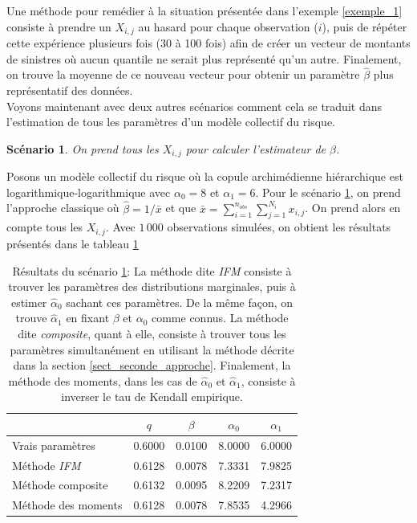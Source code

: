 \documentclass[11pt]{article}
\newtheorem{scenario}{Scénario}
\begin{document}
 		Une méthode pour remédier à la situation présentée dans l'exemple \ref{exemple_1} consiste à prendre un $X_{i,j}$ au hasard pour chaque observation ($i$), puis de répéter cette expérience plusieurs fois (30 à 100 fois) afin de créer un vecteur de montants de sinistres où aucun quantile ne serait plus représenté qu'un autre. Finalement, on trouve la moyenne de ce nouveau vecteur pour obtenir un paramètre $\hat{\beta}$ plus représentatif des données. \\
 		
 		Voyons maintenant avec deux autres scénarios comment cela se traduit dans l'estimation de tous les paramètres d'un modèle collectif du risque.
 		
 		\begin{scenario}\label{scenario_tous_les_Xij}
 			On prend tous les $X_{i,j}$ pour calculer l'estimateur de $\beta$.
 		\end{scenario}
 			Posons un modèle collectif du risque où la copule archimédienne hiérarchique est logarithmique-logarithmique avec $\alpha_0 = 8$ et $\alpha_1=6$. Pour le scénario \ref{scenario_tous_les_Xij}, on prend l'approche classique où $\hat{\beta} = 1 / \bar{x}$ et que $\bar{x} = \sum_{i=1}^{n_{obs}} \sum_{j=1}^{N_i} x_{i,j}$. On prend alors en compte tous les $X_{i,j}$. Avec $1\,000$ observations simulées, on obtient les résultats présentés dans le tableau \ref{tbl_resultats_scenario_3}
 		
 			\begin{table}[H]
 				\centering
 				\begin{tabular}{lcccc}
 					\hline
 					& $q$ & $\beta$ & $\alpha_0$ & $\alpha_1$ \\ 
 					\hline
 					Vrais paramètres & 0.6000 & 0.0100 & 8.0000 & 6.0000 \\ 
 					Méthode \textit{IFM} & 0.6128 & 0.0078 & 7.3331 & 7.9825 \\ 
 					Méthode composite & 0.6132 & 0.0095 & 8.2209 & 7.2317 \\ 
 					Méthode des moments & 0.6128 & 0.0078 & 7.8535 & 4.2966 \\ 
 					\hline
 				\end{tabular}
 			\caption[Résultats du scénario \ref{scenario_tous_les_Xij}]{Résultats du scénario \ref{scenario_tous_les_Xij}: La méthode dite \textit{IFM} consiste à trouver les paramètres des distributions marginales, puis à estimer $\hat{\alpha}_{0}$ sachant ces paramètres. De la même façon, on trouve $\hat{\alpha}_{1}$ en fixant $\beta$ et $\alpha_{0}$ comme connus. La méthode dite \textit{composite}, quant à elle, consiste à trouver tous les paramètres simultanément en utilisant la méthode décrite dans la section \ref{sect_seconde_approche}. Finalement, la méthode des moments, dans les cas de $\hat{\alpha}_{0}$ et $\hat{\alpha}_{1}$, consiste à inverser le tau de Kendall empirique.}
 			\label{tbl_resultats_scenario_3}	
 			\end{table}
 		
\end{document}
